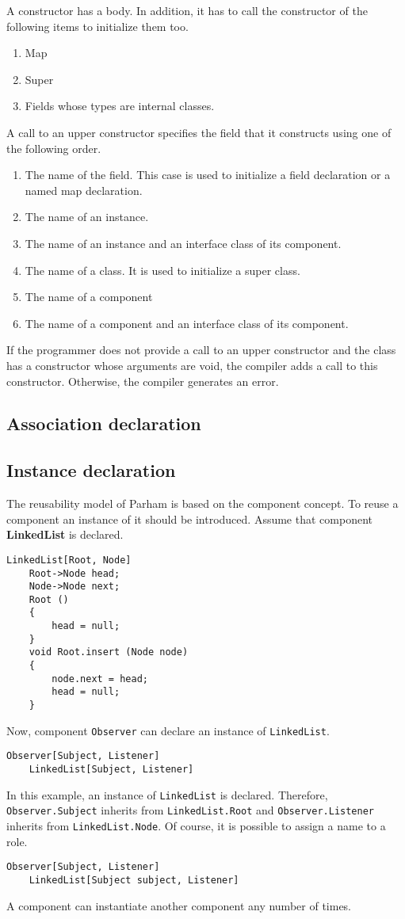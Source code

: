 \documentclass[acmsmall]{acmart}
\begin{document}
A constructor has a body.
In addition, it has to call the constructor of the following items to initialize them too.
\begin{enumerate}
\item Map
\item Super
\item Fields whose types are internal classes.
\end{enumerate}
A call to an upper constructor specifies the field that it constructs using one of the following order.
\begin{enumerate}
\item The name of the field. This case is used to initialize a field declaration or a named map declaration.
\item The name of an instance.
\item The name of an instance and an interface class of its component.
\item The name of a class. It is used to initialize a super class.
\item The name of a component
\item The name of a component and an interface class of its component.
\end{enumerate}
If the programmer does not provide a call to an upper constructor and the class has a constructor whose arguments are void, the compiler adds a call to this constructor.
Otherwise, the compiler generates an error.

\subsection{Association declaration}
\subsection{Instance declaration}
The reusability model of Parham is based on the component concept.
To reuse a component an instance of it should be introduced.
Assume that component \textbf{LinkedList} is declared.
\begin{lstlisting}
LinkedList[Root, Node]
	Root->Node head;
	Node->Node next;
	Root ()
	{
		head = null;
	}
	void Root.insert (Node node)
	{
		node.next = head;
		head = null;
	}
\end{lstlisting}
Now, component \texttt{Observer} can declare an instance of \texttt{LinkedList}.
\begin{lstlisting}
Observer[Subject, Listener]
	LinkedList[Subject, Listener]
\end{lstlisting}
In this example, an instance of \texttt{LinkedList} is declared.
Therefore, \texttt{Observer.Subject} inherits from \texttt{LinkedList.Root} and \texttt{Observer.Listener} inherits from \texttt{LinkedList.Node}.
Of course, it is possible to assign a name to a role.
\begin{lstlisting}
Observer[Subject, Listener]
	LinkedList[Subject subject, Listener]
\end{lstlisting}
A component can instantiate another component any number of times.
\end{document}
